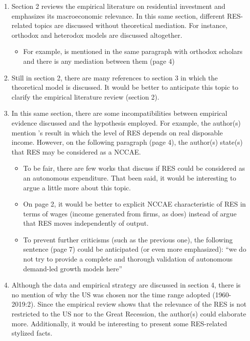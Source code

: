 \documentclass[11pt]{article}
\begin{document}
\begin{enumerate}
\item Section 2 reviews the empirical literature on residential investment and emphasizes its macroeconomic relevance. In this same section, different RES-related topics are discussed without theoretical mediation. For instance, orthodox and heterodox models are discussed altogether.
\begin{itemize}
\item For example, \textcite{arestis_economic_2019} is mentioned in the same paragraph with orthodox scholars and there is any mediation between them (page 4)
\end{itemize}
\item Still in section 2, there are many references to section 3 in which the theoretical model is discussed. It would be better to anticipate this topic to clarify the empirical literature review (section 2).
\item In this same section, there are some incompatibilities between empirical evidence discussed and the hypothesis employed. For example, the author(s) mention \citeauthor*{arestis_economic_2019}'s \citeyear{arestis_economic_2019} result in which the level of RES depends on real disposable income. However, on the following paragraph (page 4), the author(s) state(s) that RES may be considered as a NCCAE.

\begin{itemize}
\item To be fair, there are few works that discuss if RES could be considered as an autonomous expenditure. That been said, it would be interesting to argue a little more about this topic.
\item On page 2, it would be better to explicit NCCAE characteristic of RES in terms of wages (income generated from firms, as \textcite{serrano_long_1995} does) instead of argue that RES moves independently of output.
\item To prevent further criticisms (such as the previous one), the following sentence (page 7) could be anticipated (or even more emphasized): ``we do not try to provide a complete and thorough validation of autonomous demand-led growth models here''
\end{itemize}

\item Although the data and empirical strategy are discussed in section 4, there is no mention of why the US was chosen nor the time range adopted (1960-2019:2). Since the empirical review shows that the relevance of the RES is not restricted to the US nor to the Great Recession, the author(s) could elaborate more. Additionally, it would be interesting to present some RES-related stylized facts.


\end{enumerate}
\end{document}
